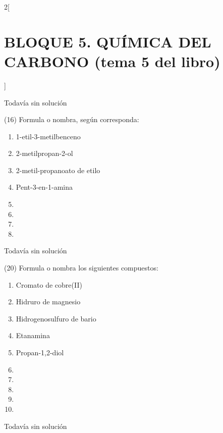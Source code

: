 \documentclass[10pt]{article}
\begin{document}
\begin{multicols}{2}[
  \section{BLOQUE 5. QUÍMICA DEL CARBONO (tema 5 del libro)}
  ]
\begin{solution}[print=false]
  Todavía sin solución
\end{solution}

\begin{exercise}
  (16) Formula o nombra, según corresponda:
  \begin{enumerate}
    \item 1-etil-3-metilbenceno
    \item 2-metilpropan-2-ol
    \item 2-metil-propanoato de etilo
    \item Pent-3-en-1-amina
    \item {}
    \item {}
    \item {}
    \item {}
  \end{enumerate}
\end{exercise}

\begin{solution}[print=false]
  Todavía sin solución
\end{solution}

\begin{exercise}
  (20) Formula o nombra los siguientes compuestos:
  \begin{enumerate}
    \item Cromato de cobre(II)
    \item Hidruro de magnesio
    \item Hidrogenosulfuro de bario
    \item Etanamina
    \item Propan-1,2-diol
    \item {}
    \item {}
    \item {}
    \item {}
    \item {}
  \end{enumerate}
\end{exercise}

\begin{solution}[print=false]
  Todavía sin solución
\end{solution}


\end{multicols}
\end{document}
